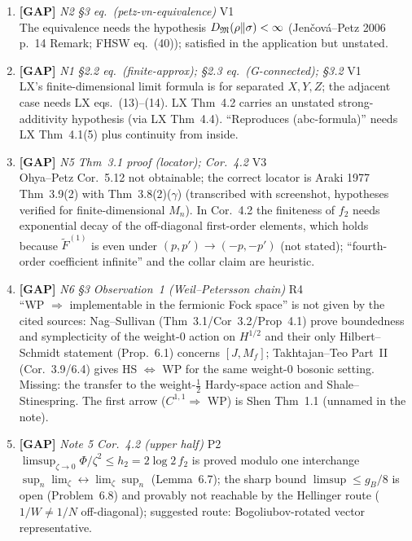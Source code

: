 \documentclass[11pt]{article}
\begin{document}
\begin{enumerate}[leftmargin=1.6em,itemsep=6pt]
\item \textbf{[GAP]} \emph{N2 \S3 eq.\ (petz-vn-equivalence)} \hfill\textsc{V1}\\ The equivalence needs the hypothesis \(D_{\mathfrak M}(\rho\Vert\sigma)<\infty\) (Jen\v cov\'a--Petz 2006 p.~14 Remark; FHSW eq.~(40)); satisfied in the application but unstated.
\item \textbf{[GAP]} \emph{N1 \S2.2 eq.\ (finite-approx); \S2.3 eq.\ (G-connected); \S3.2} \hfill\textsc{V1}\\ LX's finite-dimensional limit formula is for separated \(X,Y,Z\); the adjacent case needs LX eqs.\ (13)--(14). LX Thm~4.2 carries an unstated strong-additivity hypothesis (via LX Thm~4.4). ``Reproduces (abc-formula)'' needs LX Thm~4.1(5) plus continuity from inside.
\item \textbf{[GAP]} \emph{N5 Thm~3.1 proof (locator); Cor.~4.2} \hfill\textsc{V3}\\ Ohya--Petz Cor.~5.12 not obtainable; the correct locator is Araki 1977 Thm~3.9(2) with Thm~3.8(2)(\(\gamma\)) (transcribed with screenshot, hypotheses verified for finite-dimensional \(M_n\)). In Cor.~4.2 the finiteness of \(f_2\) needs exponential decay of the off-diagonal first-order elements, which holds because \(\widetilde F^{(1)}\) is even under \((p,p')\to(-p,-p')\) (not stated); ``fourth-order coefficient infinite'' and the collar claim are heuristic.
\item \textbf{[GAP]} \emph{N6 \S3 Observation~1 (Weil--Petersson chain)} \hfill\textsc{R4}\\ ``WP \(\Rightarrow\) implementable in the fermionic Fock space'' is not given by the cited sources: Nag--Sullivan (Thm~3.1/Cor~3.2/Prop~4.1) prove boundedness and symplecticity of the weight-0 action on \(H^{1/2}\) and their only Hilbert--Schmidt statement (Prop.~6.1) concerns \([J,M_f]\); Takhtajan--Teo Part~II (Cor.~3.9/6.4) gives HS \(\Leftrightarrow\) WP for the same weight-0 bosonic setting. Missing: the transfer to the weight-\(\frac12\) Hardy-space action and Shale--Stinespring. The first arrow (\(C^{1,1}\Rightarrow\) WP) is Shen Thm~1.1 (unnamed in the note).
\item \textbf{[GAP]} \emph{Note 5 Cor.~4.2 (upper half)} \hfill\textsc{P2}\\ \(\limsup_{\zeta\to0}\Phi/\zeta^2\le h_2=2\log2\,f_2\) is proved modulo one interchange \(\sup_n\lim_\zeta\leftrightarrow\lim_\zeta\sup_n\) (Lemma~6.7); the sharp bound \(\limsup\le g_B/8\) is open (Problem~6.8) and provably not reachable by the Hellinger route (\(1/W\ne1/N\) off-diagonal); suggested route: Bogoliubov-rotated vector representative.

\end{enumerate}
\end{document}
